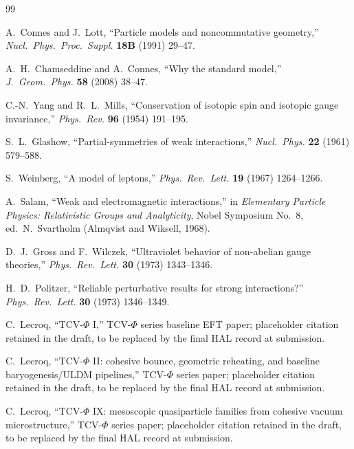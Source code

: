 \documentclass[11pt]{article}
\begin{document}
\begin{thebibliography}{99}

A.~Connes and J.~Lott,
``Particle models and noncommutative geometry,''
\emph{Nucl.\ Phys.\ Proc.\ Suppl.} \textbf{18B} (1991) 29--47.

A.~H.~Chamseddine and A.~Connes,
``Why the standard model,''
\emph{J.\ Geom.\ Phys.} \textbf{58} (2008) 38--47.

C.-N.~Yang and R.~L.~Mills,
``Conservation of isotopic spin and isotopic gauge invariance,''
\emph{Phys.\ Rev.} \textbf{96} (1954) 191--195.

S.~L.~Glashow,
``Partial-symmetries of weak interactions,''
\emph{Nucl.\ Phys.} \textbf{22} (1961) 579--588.

S.~Weinberg,
``A model of leptons,''
\emph{Phys.\ Rev.\ Lett.} \textbf{19} (1967) 1264--1266.

A.~Salam,
``Weak and electromagnetic interactions,''
in \emph{Elementary Particle Physics: Relativistic Groups and Analyticity},
Nobel Symposium No.~8, ed.\ N.~Svartholm (Almqvist and Wiksell, 1968).

D.~J.~Gross and F.~Wilczek,
``Ultraviolet behavior of non-abelian gauge theories,''
\emph{Phys.\ Rev.\ Lett.} \textbf{30} (1973) 1343--1346.

H.~D.~Politzer,
``Reliable perturbative results for strong interactions?''
\emph{Phys.\ Rev.\ Lett.} \textbf{30} (1973) 1346--1349.

C.~Lecroq,
``TCV-$\Phi$ I,''
TCV-$\Phi$ series baseline EFT paper; placeholder citation retained in the draft, to be replaced by the final HAL record at submission.

C.~Lecroq,
``TCV-$\Phi$ II: cohesive bounce, geometric reheating, and baseline baryogenesis/ULDM pipelines,''
TCV-$\Phi$ series paper; placeholder citation retained in the draft, to be replaced by the final HAL record at submission.

C.~Lecroq,
``TCV-$\Phi$ IX: mesoscopic quasiparticle families from cohesive vacuum microstructure,''
TCV-$\Phi$ series paper; placeholder citation retained in the draft, to be replaced by the final HAL record at submission.

\end{thebibliography}
\end{document}
